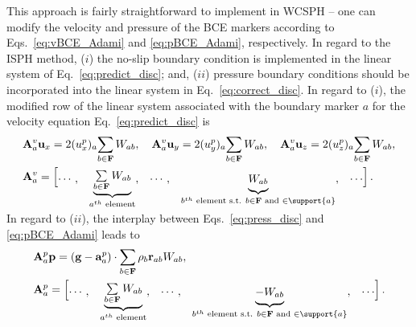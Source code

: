 This approach is fairly straightforward to implement in WCSPH -- one can modify the velocity and  pressure of the BCE markers according to Eqs.~\ref{eq:vBCE_Adami} and \ref{eq:pBCE_Adami}, respectively. In regard to the ISPH method, ($i$) the no-slip boundary condition is implemented in the linear system of Eq.~\ref{eq:predict_disc}; and, ($ii$) pressure boundary conditions should be incorporated into the linear system in Eq.~\ref{eq:correct_disc}. In regard to ($i$), the modified row of the linear system associated with the boundary marker $a$ for the velocity equation Eq.~\ref{eq:predict_disc} is
\begin{align}\renewcommand{\arraystretch}{1.2}
&\mathbf{A}^{v}_a \mathbf{u}_x=  2 ({u}_x^{p})_a {\sum\limits_{b \in \mathbf{F}} {W_{ab}}},
\quad
\mathbf{A}^{v}_a \mathbf{u}_y=  2 ({u}_y^{p})_a {\sum\limits_{b \in \mathbf{F}} {W_{ab}}}, 
\quad
\mathbf{A}^{v}_a \mathbf{u}_z=  2 ({u}_z^{p})_a {\sum\limits_{b \in \mathbf{F}} {W_{ab}}},  \\
&\mathbf{A}^{v}_a= \begin{bmatrix}
\cdots, & 
\smash[b]{\underbrace{\begin{matrix}{\sum\limits_{b \in \mathbf{F}} {W_{ab}}} \end{matrix}}_{a^{th}\text{ element}}} ,
&\cdots, &\smash[b]{\underbrace{\begin{matrix} {W_{ab}}\end{matrix}}_{b^{th}\text{ element s.t. }{b \in \mathbf{F} \text{ and } \in \support{a}} }}, & \cdots
\end{bmatrix} \label{eq:U_BC}.
\end{align}
\\
In regard to ($ii$), the interplay between Eqs.~\ref{eq:press_disc} and \ref{eq:pBCE_Adami} leads to
\begin{align}\renewcommand{\arraystretch}{1.2}
&\mathbf{A}^{p}_a \mathbf{p}= \left( \mathbf{g} - \mathbf{a}_a^p \right) \cdot \sum\limits_{b \in \bf F} {\rho_b \mathbf{r}_{ab} W_{ab} },\\
&\mathbf{A}^{p}_a= \begin{bmatrix}
\cdots, & 
\smash[b]{\underbrace{\begin{matrix}{\sum\limits_{b \in \mathbf{F}} {W_{ab}}} \end{matrix}}_{a^{th}\text{ element}}} ,
&\cdots, &\smash[b]{\underbrace{\begin{matrix} {-W_{ab}}\end{matrix}}_{b^{th}\text{ element s.t. }{b \in \mathbf{F} \text{ and } \in \support{a}} }}, & \cdots
\end{bmatrix} \label{eq:p_BC}.
\end{align}
\\

